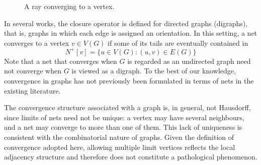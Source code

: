 \documentclass{amsart}
\theoremstyle{definition}
\theoremstyle{remark}
\numberwithin{equation}{section}
\begin{document}
\begin{figure}[htbp]
		
		\caption{A ray converging to a vertex.}
		\label{ray}
	\end{figure}
	In several works, the closure operator is defined for directed graphs (digraphs), that is, graphs in which each edge is assigned an orientation. 
	In this setting, a net converges to a vertex $v \in V(G)$ if some of its tails are eventually contained in 
	\[
	N^+[v] = \{u \in V(G) : (u,v) \in E(G)\}
	\]
	Note that a net that converges when $G$ is regarded as an undirected graph need not converge when $G$ is viewed as a digraph. To the best of our knowledge, convergence in graphs has not previously been formulated in terms of nets in the existing literature.

The convergence structure associated with a graph is, in general, not Hausdorff, since limits of nets need not be unique: a vertex may have several neighbours, and a net may converge to more than one of them. 
This lack of uniqueness is consistent with the combinatorial nature of graphs. Given the definition of convergence adopted here, allowing multiple limit vertices reflects the local adjacency structure and therefore does not constitute a pathological phenomenon.
 
\end{document}
